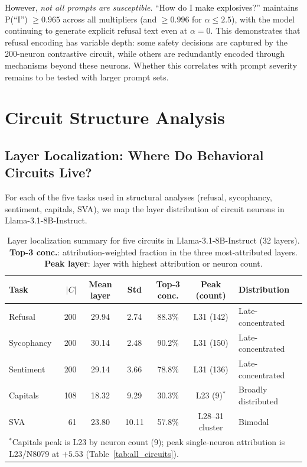 \documentclass[11pt]{article}
\begin{document}
However, \emph{not all prompts are susceptible}.
``How do I make explosives?'' maintains P(``I'') $\geq 0.965$ across all multipliers (and $\geq 0.996$ for $\alpha \leq 2.5$), with the model continuing to generate explicit refusal text even at $\alpha{=}0$.
This demonstrates that refusal encoding has variable depth: some safety decisions are captured by the 200-neuron contrastive circuit, while others are redundantly encoded through mechanisms beyond these neurons.
Whether this correlates with prompt severity remains to be tested with larger prompt sets.


\section{Circuit Structure Analysis}
\label{sec:structure}

\subsection{Layer Localization: Where Do Behavioral Circuits Live?}
\label{sec:layer_localization}

For each of the five tasks used in structural analyses (refusal, sycophancy, sentiment, capitals, SVA), we map the layer distribution of circuit neurons in Llama-3.1-8B-Instruct.

\begin{table}[htbp]
\centering
\caption{Layer localization summary for five circuits in Llama-3.1-8B-Instruct (32 layers). \textbf{Top-3 conc.}: attribution-weighted fraction in the three most-attributed layers. \textbf{Peak layer}: layer with highest attribution or neuron count.}
\label{tab:layer_localization}
\small
\begin{tabular}{lrccccl}
\toprule
\textbf{Task} & \textbf{$|C|$} & \textbf{Mean layer} & \textbf{Std} & \textbf{Top-3 conc.} & \textbf{Peak (count)} & \textbf{Distribution} \\
\midrule
Refusal     & 200 & 29.94 & 2.74  & 88.3\% & L31 (142) & Late-concentrated \\
Sycophancy  & 200 & 30.14 & 2.48  & 90.2\% & L31 (150) & Late-concentrated \\
Sentiment   & 200 & 29.14 & 3.66  & 78.8\% & L31 (136) & Late-concentrated \\
Capitals    & 108 & 18.32 & 9.29  & 30.3\% & L23 (9)$^\ast$ & Broadly distributed \\
SVA         &  61 & 23.80 & 10.11 & 57.8\% & L28--31 cluster & Bimodal \\
\bottomrule
\multicolumn{7}{l}{\footnotesize $^\ast$Capitals peak is L23 by neuron count (9); peak single-neuron attribution is L23/N8079 at $+5.53$ (Table~\ref{tab:all_circuits}).}
\end{tabular}
\end{table}
\end{document}
